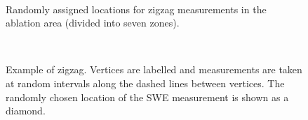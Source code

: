 \documentclass[12pt]{article}
\begin{document}
\begin{landscape}
\begin{figure}
	\centering
	\\
	\caption{Randomly assigned locations for zigzag measurements in the ablation area (divided into seven zones).}
	\label{zigzag_planned}
\end{figure}
\end{landscape}

\begin{figure}
	\centering
	\\
	\caption{Example of zigzag. Vertices are labelled and measurements are taken at random intervals along the dashed lines between vertices. The randomly chosen location of the SWE measurement is shown as a diamond.}
	\label{zigzag_vertex}
\end{figure}
\end{document}
